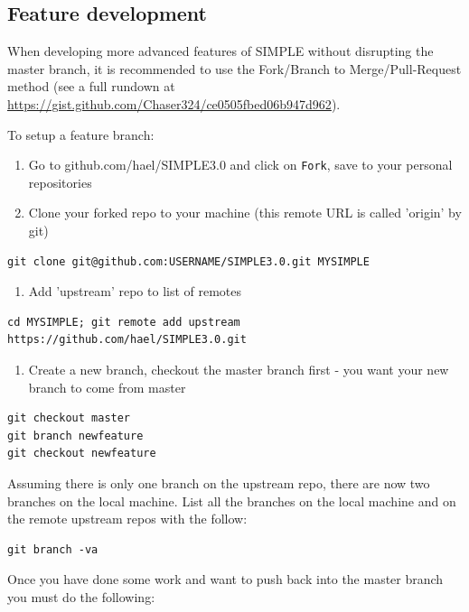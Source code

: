 \documentclass[a4paper,11pt]{article}
\begin{document}
\subsection{Feature development}
\label{sec:org5fb5e43}

When developing more advanced features of SIMPLE without disrupting the
master branch, it is recommended to use the Fork/Branch to
Merge/Pull-Request method (see a full rundown at
\url{https://gist.github.com/Chaser324/ce0505fbed06b947d962}).

To setup a feature branch:

\begin{enumerate}
\item Go to github.com/hael/SIMPLE3.0 and click on \texttt{Fork}, save to your personal repositories

\item Clone your forked repo to your machine (this remote URL is called 'origin' by git)
\end{enumerate}
\begin{verbatim}
git clone git@github.com:USERNAME/SIMPLE3.0.git MYSIMPLE
\end{verbatim}

\begin{enumerate}
\item Add 'upstream' repo to list of remotes
\end{enumerate}
\begin{verbatim}
cd MYSIMPLE; git remote add upstream https://github.com/hael/SIMPLE3.0.git
\end{verbatim}

\begin{enumerate}
\item Create a new branch, checkout the master branch first - you want your new branch to come from master
\end{enumerate}
\begin{verbatim}
git checkout master
git branch newfeature
git checkout newfeature
\end{verbatim}

Assuming there is only one branch on the upstream repo, there are now two branches on the local machine.
List all the branches on the local machine and on the remote upstream repos with the follow:
\begin{verbatim}
git branch -va
\end{verbatim}

Once you have done some work and want to push back into the master branch you must do the following:
\end{document}
